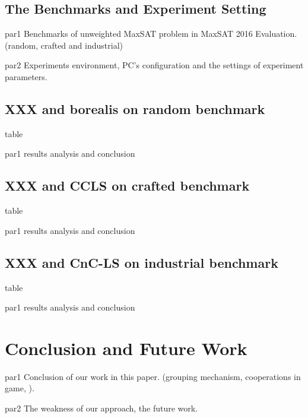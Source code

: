 \documentclass{llncs}
\begin{document}
\subsection{The Benchmarks and Experiment Setting}
\par par1 Benchmarks of unweighted MaxSAT problem in MaxSAT 2016 Evaluation.(random, crafted and industrial)
\par par2 Experiments environment, PC's configuration and the settings of experiment parameters.
\subsection{XXX and borealis on random benchmark}
table
\par par1 results analysis and conclusion
\subsection{XXX and CCLS on crafted benchmark}
table
\par par1 results analysis and conclusion
\subsection{XXX and CnC-LS on industrial benchmark}
table
\par par1 results analysis and conclusion

\section{Conclusion and Future Work}
\par par1 Conclusion of our work in this paper. (grouping mechanism, cooperations in game, ).
\par par2 The weakness of our approach, the future work.


\end{document}
